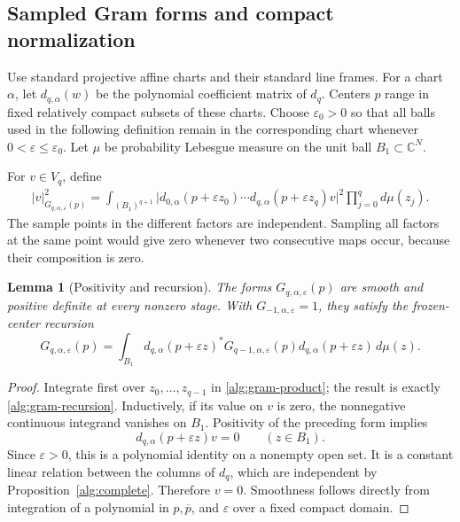 \documentclass[11pt,reqno]{amsart}
\numberwithin{equation}{section}
\newtheorem{lemma}[theorem]{Lemma}
\theoremstyle{definition}
\theoremstyle{remark}
\begin{document}
\subsection{Sampled Gram forms and compact normalization}

Use standard projective affine charts and their standard line frames.
For a chart \(\alpha\), let \(d_{q,\alpha}(w)\) be the polynomial
coefficient matrix of \(d_q\). Centers \(p\) range in fixed relatively
compact subsets of these charts. Choose \(\varepsilon_0>0\) so that all
balls used in the following definition remain in the corresponding
chart whenever \(0<\varepsilon\leq\varepsilon_0\). Let \(\mu\) be
probability Lebesgue measure on the unit ball \(B_1\subset\mathbb C^N\).

For \(v\in V_q\), define
\begin{equation}
\begin{split}
 |v|_{G_{q,\alpha,\varepsilon}(p)}^2
 =\int_{(B_1)^{q+1}}
 \bigl|d_{0,\alpha}(p+\varepsilon z_0)\cdots
 d_{q,\alpha}(p+\varepsilon z_q)v\bigr|^2
 \prod_{j=0}^{q}d\mu(z_j).
\end{split}
\label{alg:gram-product}
\end{equation}
The sample points in the different factors are independent. Sampling
all factors at the same point would give zero whenever two consecutive
maps occur, because their composition is zero.

\begin{lemma}[Positivity and recursion]
\label{alg:gram}
The forms \(G_{q,\alpha,\varepsilon}(p)\) are smooth and positive
definite at every nonzero stage. With \(G_{-1,\alpha,\varepsilon}=1\),
they satisfy the frozen-center recursion
\begin{equation}
 G_{q,\alpha,\varepsilon}(p)=
 \int_{B_1}d_{q,\alpha}(p+\varepsilon z)^*
 G_{q-1,\alpha,\varepsilon}(p)
 d_{q,\alpha}(p+\varepsilon z)\,d\mu(z).
 \label{alg:gram-recursion}
\end{equation}
\end{lemma}

\begin{proof}
Integrate first over \(z_0,\ldots,z_{q-1}\) in
\eqref{alg:gram-product}; the result is exactly
\eqref{alg:gram-recursion}. Inductively, if its value on \(v\) is zero,
the nonnegative continuous integrand vanishes on \(B_1\). Positivity of
the preceding form implies
\[
 d_{q,\alpha}(p+\varepsilon z)v=0\qquad(z\in B_1).
\]
Since \(\varepsilon>0\), this is a polynomial identity on a nonempty
open set. It is a constant linear relation between the columns of
\(d_q\), which are independent by Proposition~\ref{alg:complete}.
Therefore \(v=0\). Smoothness follows directly from integration of a
polynomial in \(p,\overline p\), and \(\varepsilon\) over a fixed compact
domain.
\end{proof}
\end{document}
